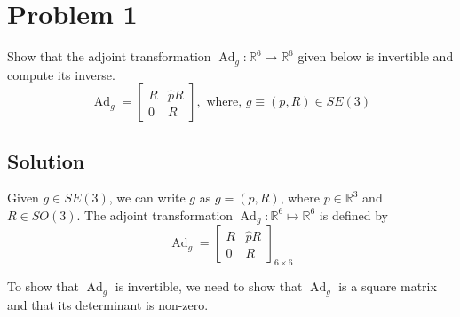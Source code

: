 \section*{Problem 1}

Show that the adjoint transformation \( \operatorname{Ad}_{g}: \mathbb{R}^{6} \mapsto \mathbb{R}^{6} \) given below is invertible and compute its inverse.
\[
    \operatorname{Ad}_{g}=\left[\begin{array}{cc}
            R & \widehat{p} R \\
            0 & R
        \end{array}\right], \text { where, } g \equiv(p, R) \in SE(3)
\]

\subsection*{Solution}

Given \( g \in SE(3) \), we can write \( g \) as \( g = (p, R) \), where \( p \in \mathbb{R}^{3} \) and \( R \in SO(3) \). The adjoint transformation \( \operatorname{Ad}_{g}: \mathbb{R}^{6} \mapsto \mathbb{R}^{6} \) is defined by
\begin{equation*}
    \operatorname{Ad}_{g}
    =
    \begin{bmatrix}
        R & \widehat{p} R \\
        0 & R
    \end{bmatrix}_{6 \times 6}
\end{equation*}

To show that \( \operatorname{Ad}_{g} \) is invertible, we need to show that \( \operatorname{Ad}_{g} \) is a square matrix and that its determinant is non-zero.

